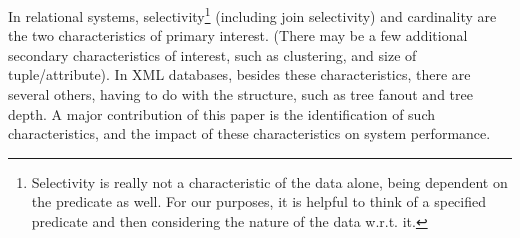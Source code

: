 In relational systems, selectivity\footnote{Selectivity is really not
a characteristic of the data alone, being dependent on the predicate
as well.  For our purposes, it is helpful to think of a specified
predicate and then considering the nature of the data w.r.t. it.}
(including join selectivity) and cardinality are the two
characteristics of primary interest.  (There may be a few additional
secondary characteristics of interest, such as clustering, and size of
tuple/attribute).  In XML databases, besides these characteristics,
there are several others, having to do with the structure, such as
tree fanout and tree depth. A major contribution of this paper is the
identification of such characteristics, and the impact of these
characteristics on system performance.
